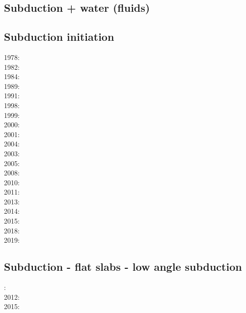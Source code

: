 \subsection*{Subduction + water (fluids)}

\cite{geme11}
\cite{fagm12}
\cite{qubu14}
\cite{ceww17}
\cite{ceww19}

\subsection*{Subduction initiation}

1978: \cite{bird78}\\
1982: \cite{clwv82}\\
1984: \cite{cade84}\\
1989: \cite{clwv89}\\
1991: \cite{muph91}\\
1998: \cite{togu98}\\
1999: \cite{fagd99}\\
2000: \cite{pybf00}\\
2001: \cite{dohe01}\cite{reyb01}\cite{brry01}\\
2004: \cite{ster04}\cite{guhl04}\\
2003: \cite{hags03}\\
2005: \cite{bihi05}\\
2008: \cite{uegs08}\\
2010: \cite{nigm10}\cite{bucl10}\\
2011: \cite{bagw11}\cite{nigm11}\\
2013: \cite{dyge13}\cite{mana13}\\
2014: \cite{recf14}\cite{macg14}\\
2015: \cite{matv15}\cite{pebu15}\cite{vapm15}\\
2018: \cite{zhlg18}\cite{basq18}\\
2019: \cite{begb19}\cite{gubg19}

\subsection*{Subduction - flat slabs - low angle subduction}

: \cite{cube11}\\
2012: \cite{mapm12}\\
2015: \cite{gehm15}

